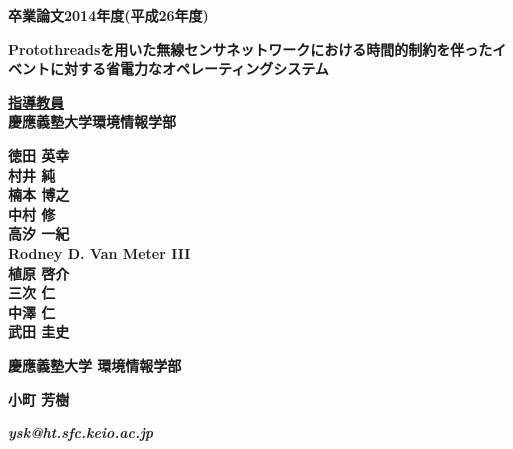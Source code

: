 \pagestyle{empty}

\begin{center}

\vspace{5cm}

\textbf{\Large 卒業論文2014年度(平成26年度)}

\vspace{1cm}

\textbf{\LARGE Protothreadsを用いた無線センサネットワークにおける時間的制約を伴ったイベントに対する省電力なオペレーティングシステム}
\vspace{2cm}

\textbf{\underline{\large 指導教員}}\\
\textbf{慶應義塾大学環境情報学部}

\textbf{\Large 徳田 英幸}\\
\textbf{\Large 村井 純}\\
\textbf{\Large 楠本 博之}\\
\textbf{\Large 中村 修}\\
\textbf{\Large 高汐 一紀}\\
\textbf{\Large Rodney D. Van Meter III}\\
\textbf{\Large 植原 啓介}\\
\textbf{\Large 三次 仁}\\
\textbf{\Large 中澤 仁}\\
\textbf{\Large 武田 圭史}

\vspace{6cm}

\textbf{\LARGE 慶應義塾大学 環境情報学部}

\vspace{.5em}

\textbf{\LARGE 小町 芳樹}

\vspace{.3em}

\textbf{\it ysk@ht.sfc.keio.ac.jp}



\newpage

\end{center}

\pagestyle{plain}
